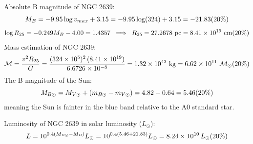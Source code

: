 Absolute B magnitude of NGC 2639:
\[
M_B = -9.95 \log v_{max} + 3.15 = -9.95 \log(324) + 3.15 = -21.83
\hfill(20\%)
\]
\[
\log R_{25} = -0.249 M_B - 4.00 = 1.4357
\;\;\Longrightarrow\;\;
R_{25} = 27.2678~\mathrm{pc} = 8.41 \times 10^{19}~\mathrm{cm}
\hfill(20\%)
\]
Mass estimation of NGC 2639:
\[
\mathcal{M} = \frac{v^2 R_{25}}{G}
= \frac{(324 \times 10^{5})^{2}\,(8.41 \times 10^{19})}{6.6726 \times 10^{-8}}
= 1.32 \times 10^{42}~\mathrm{kg}
= 6.62 \times 10^{11}~\mathcal{M}_\odot
\hfill(20\%)
\]
The B magnitude of the Sun:
\[
M_{B\odot} = M_{V\odot} + (m_{B\odot} - m_{V\odot}) = 4.82 + 0.64 = 5.46
\hfill(20\%)
\]
meaning the Sun is fainter in the blue band relative to the A0 standard star.

Luminosity of NGC 2639 in solar luminosity ($L_\odot$):
\[
L = 10^{0.4(M_{B\odot} - M_B)} L_\odot
= 10^{0.4(5.46 + 21.83)} L_\odot
= 8.24 \times 10^{10}\,L_\odot
\hfill(20\%)
\]
